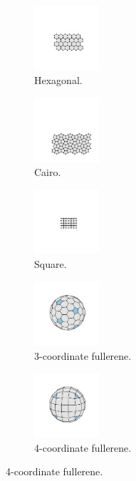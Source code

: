 \begin{figure}[bt]
     \centering
     
     \begin{subfigure}[b]{0.3\textwidth}
         \centering
         \includegraphics[height=2.4cm]{./figures/methods/hex.pdf}
         \caption{Hexagonal.}
         \label{fig:latticeshex}
     \end{subfigure}
     \hfill
     \begin{subfigure}[b]{0.3\textwidth}
         \centering
         \includegraphics[height=2.4cm]{./figures/methods/cai.pdf}
         \caption{Cairo.}
         \label{fig:latticescairo}
     \end{subfigure}
     \hfill
	\begin{subfigure}[b]{0.3\textwidth}
         \centering
         \includegraphics[height=2.4cm]{./figures/methods/sq.pdf}
         \caption{Square.}
         \label{fig:latticessq}
     \end{subfigure}
     \hfill
     \vspace{0.5cm}
     
       \begin{subfigure}[b]{0.45\textwidth}
         \centering
         \includegraphics[height=2.4cm]{./figures/methods/full92.pdf}
         \caption{3\--coordinate fullerene.}
         \label{fig:latticesfull92}
     \end{subfigure}
     \hspace{1cm}
     \begin{subfigure}[b]{0.45\textwidth}
         \centering
         \includegraphics[height=2.4cm]{./figures/methods/full98.pdf}
         \caption{4\--coordinate fullerene.}
         \label{fig:latticesfull98}
     \end{subfigure}
     

\end{figure}
